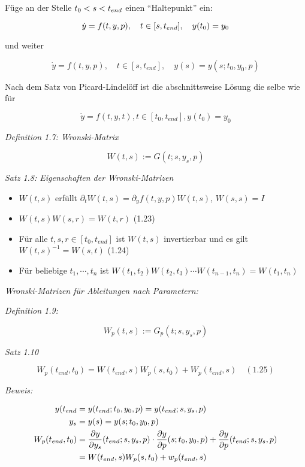 
Füge an der Stelle $t_0 < s < {t_{end}}$ einen "`Haltepunkt"' ein:

\[\dot y = f(t,y,p),\quad t\in[s,{t_{end}}],\quad y(t_0) = y_0\]

und weiter

\[\dot y = f(t,y,p),\quad t\in[s,t_{end}],\quad y(s) = y(s; t_0, y_0, p) \]

Nach dem Satz von Picard-Lindelöff ist die abschnittsweise Lösung die selbe wie für

\[\dot y = f(t,y,t), t\in[t_0,t_{end}], y(t_0) = y_0 \]

\emph{Definition 1.7: Wronski-Matrix}

\[W(t,s) := G(t; s, y_s, p) \]

\emph{Satz 1.8: Eigenschaften der Wronski-Matrizen}

\begin{itemize}
\item $W(t,s)$ erfüllt $\partial_t W(t,s) = \partial_y f(t,y,p) W(t,s)$, $W(s,s) = I$ 
\item $W(t,s) W(s,r) = W(t,r)$ (1.23)
\item Für alle $t,s,r \in [t_0, t_{end}]$ ist $W(t,s)$ invertierbar und es gilt $W(t,s)^{-1} = W(s,t)$ (1.24)
\item Für beliebige $t_1,\cdots,t_n$ ist $W(t_1,t_2)W(t_2,t_3) \cdots W(t_{n-1}, t_n) = W(t_1, t_n)$
\end{itemize}

\emph{Wronski-Matrizen für Ableitungen nach Parametern:}

\emph{Definition 1.9:}

\[ W_p(t,s) := G_p(t;s,y_s,p)\]

\emph{Satz 1.10}

\[ W_p(t_{end},t_0) = W(t_{end},s) W_p(s,t_0)+W_p(t_{end},s) \quad (1.25) \]

\emph{Beweis:}

\begin{align*}
y(t_{end} &= y(t_{end}; t_0, y_0, p) = y(t_{end};s,y_s,p) \\
y_s &= y(s) = y(s; t_0,y_0,p) \\
W_p(t_{end},t_0) &= \frac{\partial y}{\partial y_s}(t_{end}; s,y_s,p) \cdot \frac{\partial y}{\partial p} (s;t_0,y_0,p) +\frac{\partial y}{\partial p}({t_{end}}; s,y_s,p)\\
&= W({t_{end}},s) W_p(s,t_0) + w_p({t_{end}},s)
\end{align*}


